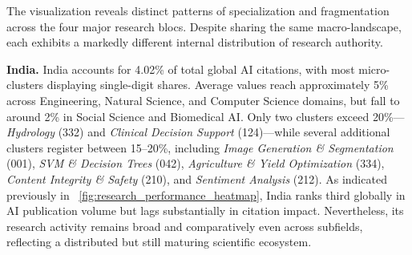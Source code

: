 \documentclass{article}
\begin{document}

The visualization reveals distinct patterns of specialization and fragmentation across the four major research blocs. Despite sharing the same macro-landscape, each exhibits a markedly different internal distribution of research authority.

\textbf{India.}  
India accounts for 4.02\% of total global AI citations, with most micro-clusters displaying single-digit shares. Average values reach approximately 5\% across Engineering, Natural Science, and Computer Science domains, but fall to around 2\% in Social Science and Biomedical AI. Only two clusters exceed 20\%—\textit{Hydrology} (332) and \textit{Clinical Decision Support} (124)—while several additional clusters register between 15–20\%, including \textit{Image Generation \& Segmentation} (001), \textit{SVM \& Decision Trees} (042), \textit{Agriculture \& Yield Optimization} (334), \textit{Content Integrity \& Safety} (210), and \textit{Sentiment Analysis} (212). As indicated previously in \figurename~\ref{fig:research_performance_heatmap}, India ranks third globally in AI publication volume but lags substantially in citation impact. Nevertheless, its research activity remains broad and comparatively even across subfields, reflecting a distributed but still maturing scientific ecosystem.
\end{document}

